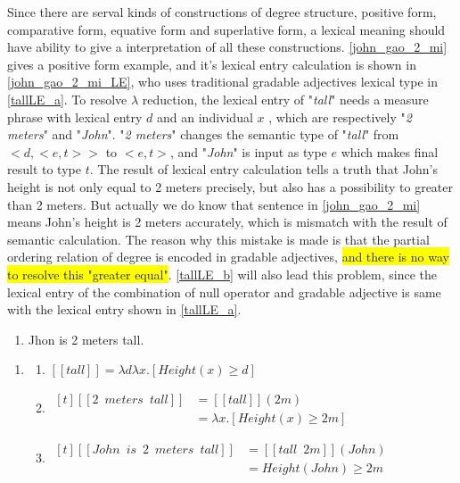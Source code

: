 \documentclass{ctexart}
\begin{document}
Since there are serval kinds of constructions of degree structure, positive form, comparative form, equative form and superlative form, a lexical meaning should have ability to give a interpretation of all these constructions. \ref{john_gao_2_mi} gives a positive form example, and it's lexical entry calculation is shown in \ref{john_gao_2_mi_LE}, who uses traditional gradable adjectives lexical type in \ref{tallLE_a}. To resolve $\lambda$ reduction, the lexical entry of "\textit{tall}" needs a measure phrase with lexical entry $d$ and an individual $x$ , which are respectively "\textit{2 meters}" and "\textit{John}". "\textit{2 meters}" changes the semantic type of "\textit{tall}" from $<d,<e,t>>$ to $<e,t>$, and "\textit{John}" is input as type $e$ which makes final result to type $t$. The result of lexical entry calculation tells a truth that John's height is not only equal to 2 meters precisely, but also has a possibility to greater than 2 meters. But actually we do know that sentence in \ref{john_gao_2_mi} means John's height is 2 meters accurately, which is mismatch with the result of semantic calculation. The reason why this mistake is made is that the partial ordering relation of degree is encoded in gradable adjectives, \colorbox{yellow}{and there is no way to resolve this "greater equal"}. \ref{tallLE_b} will also lead this problem, since the lexical entry of the combination of null operator and gradable adjective is same with the lexical entry shown in \ref{tallLE_a}.

\begin{enumerate}
    \item \label{john_gao_2_mi} Jhon is 2 meters tall.
\end{enumerate}

\begin{enumerate}
    \item \label{john_gao_2_mi_LE}
    
    \begin{enumerate}
    \item \label{john_gao_2_mi_LE_a} 
    $[\![tall]\!] = \lambda d \lambda x.[Height(x) \geq d]$
    
    \item \label{john_gao_2_mi_LE_b} 
    $\begin{aligned}[t]
        [\![2 \enspace meters \enspace tall]\!] &= [\![tall]\!](2m) \\
        &= \lambda x.[Height(x) \geq 2m]
    \end{aligned}$
    
    \item \label{john_gao_2_mi_LE_c} 
    $\begin{aligned}[t]
        [\![John \enspace is \enspace 2 \enspace meters \enspace tall]\!] &= [\![tall \enspace 2m]\!](John) \\
        &= Height(John) \geq 2m
    \end{aligned}$
    
    \end{enumerate}
\end{enumerate}
\end{document}
